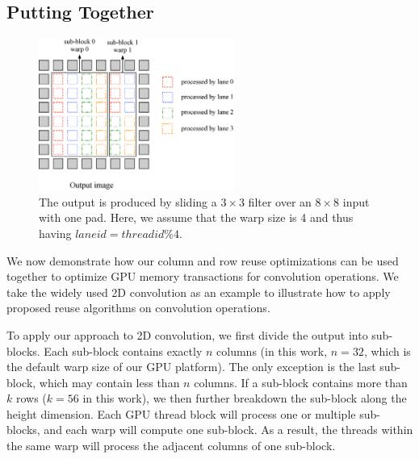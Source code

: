 \subsection{Putting Together}
\label{sec:together}
\begin{figure}
	\centering
	\includegraphics[width=0.8\columnwidth,height=5cm]{./figure/overalldesign.eps} \caption{The output is produced by sliding a $3 \times
3$ filter over an $8 \times 8$ input with one pad. Here, we assume
that the warp size is 4 and thus having $laneid=threadid\%4$.} \label{fig:overalldesign}
\vspace{-2mm}
\end{figure}


We now demonstrate how our column and row reuse optimizations can be used together to optimize GPU memory transactions for convolution
operations. We take the widely used 2D convolution as an example to illustrate how to apply proposed reuse algorithms on convolution
operations.


To apply our approach to 2D convolution, we first divide the output into sub-blocks. Each sub-block contains exactly $n$ columns (in this
work, $n = 32$, which is the default warp size of our GPU platform). The only exception is the last sub-block, which may contain less than
$n$ columns. If a sub-block contains more than $k$ rows ($k=56$ in this work), we then further breakdown the sub-block along the height
dimension. Each GPU thread block will process one or multiple sub-blocks, and each warp will compute one sub-block. As a
result, the threads within the same warp will process the adjacent columns of one sub-block.


